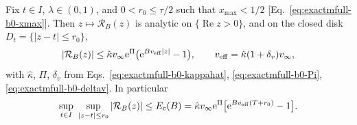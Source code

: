 \begin{proposition}
\label{prop:exactmfull-b0-chain}
Fix \(t\in I\), \(\lambda\in(0,1)\), and \(0<r_0\le\tau/2\) such that
\(x_{\max}<1/2\) [Eq.~\eqref{eq:exactmfull-b0-xmax}].  Then
\(z\mapsto\mathcal R_B(z)\) is analytic on
\(\{\operatorname{Re}z>0\}\), and on the closed disk
\(D_t=\{|z-t|\le r_0\}\),
\begin{equation}
 |\mathcal R_B(z)|
 \le\hat\kappa v_\infty\mathrm e^{\Pi}
 \bigl(\mathrm e^{Bv_{\rm eff}|z|}-1\bigr),
 \qquad
 v_{\rm eff}=\hat\kappa(1+\delta_v)v_\infty,
 \label{eq:exactmfull-b0-remainderbound}
\end{equation}
with \(\hat\kappa\), \(\Pi\), \(\delta_v\) from
Eqs.~\eqref{eq:exactmfull-b0-kappahat}, \eqref{eq:exactmfull-b0-Pi},
\eqref{eq:exactmfull-b0-deltav}.  In particular
\begin{equation}
 \sup_{t\in I}\ \sup_{|z-t|\le r_0}|\mathcal R_B(z)|
 \le E_{\rm c}(B)
 =\hat\kappa v_\infty\mathrm e^{\Pi}
 \bigl[\mathrm e^{Bv_{\rm eff}(T+r_0)}-1\bigr].
 \label{eq:exactmfull-b0-Ec}
\end{equation}
\end{proposition}

